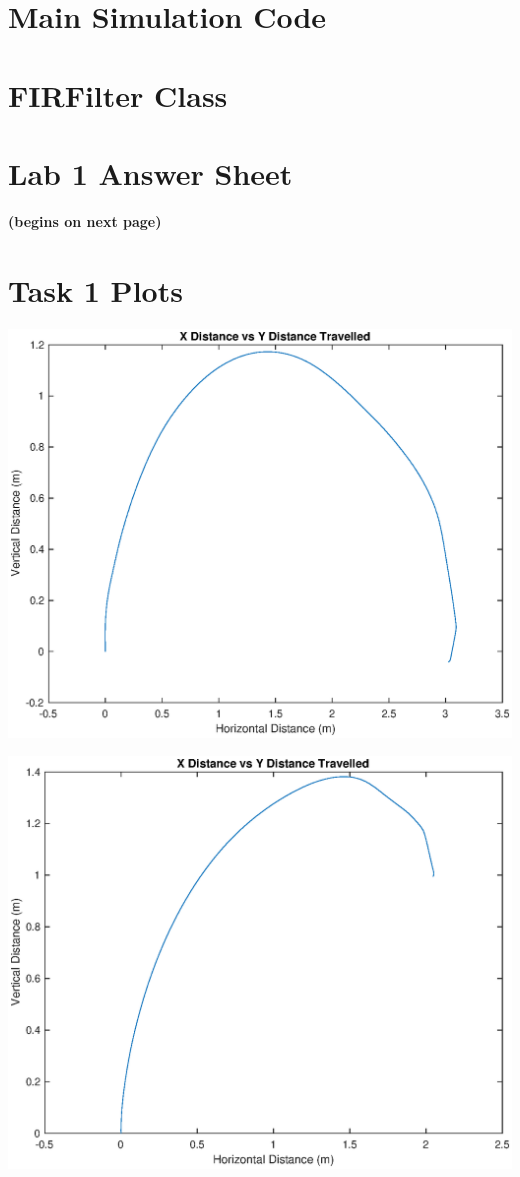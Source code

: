 \documentclass[10pt]{article}
\newcommand{\bigScale}{0.6}
\begin{document}
\pagebreak
\appendix
\section{Main Simulation Code}

\pagebreak
\section{FIRFilter Class}


\pagebreak
\section{Lab 1 Answer Sheet}
\textbf{(begins on next page)}


\pagebreak
\section{Task 1 Plots}
\centering
\includegraphics[scale=\bigScale]{./figures/task1_x0_y3.eps}

\includegraphics[scale=\bigScale]{./figures/task1_x1y2.eps}
\end{document}
